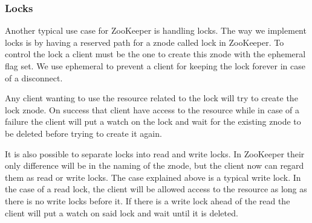 \subsubsection{Locks}
Another typical use case for ZooKeeper is handling locks. The way we implement locks is by having a reserved path for a znode called lock in ZooKeeper. To control the lock a client must be the one to create this znode with the ephemeral flag set. We use ephemeral to prevent a client for keeping the lock forever in case of a disconnect. 

Any client wanting to use the resource related to the lock will try to create the lock znode. On success that client have access to the resource while in case of a failure the client will put a watch on the lock and wait for the existing znode to be deleted before trying to create it again.

It is also possible to separate locks into read and write locks. In ZooKeeper their only difference will be in the naming of the znode, but the client now can regard them as read or write locks. The case explained above is a typical write lock. In the case of a read lock, the client will be allowed access to the resource as long as there is no write locks before it. If there is a write lock ahead of the read the client will put a watch on said lock and wait until it is deleted. 






 
